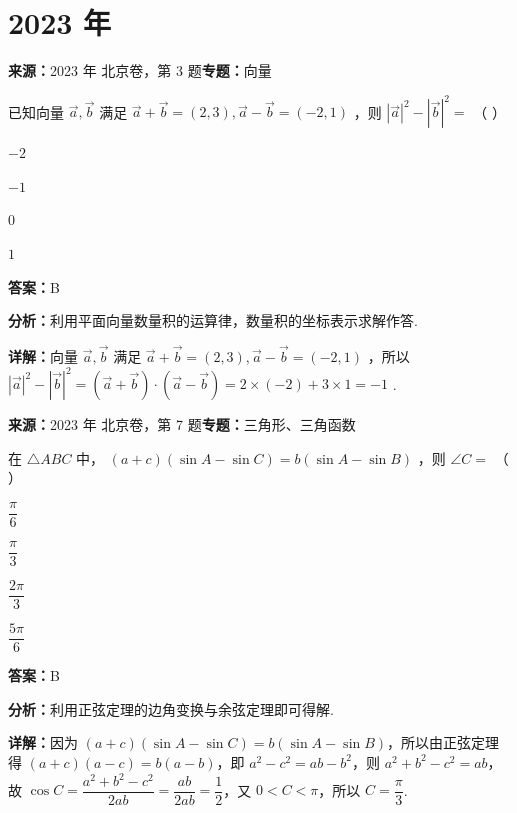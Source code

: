 \section*{2023 年}

\begin{question}[points=4]
\textbf{来源：}2023 年 北京卷，第 3 题\quad \textbf{专题：}向量\par
已知向量 $\vec{a}, \vec{b}$ 满足 $\vec{a} + \vec{b} = (2,3), \vec{a} - \vec{b} = (-2,1)$ ，则 $|\vec{a}|^2 - |\vec{b}|^2 =$ （ ）
\begin{choices}
  \item $-2$
  \item $-1$
  \item $0$
  \item $1$
\end{choices}
\begin{solution}
\textbf{答案：}B

\textbf{分析：}利用平面向量数量积的运算律，数量积的坐标表示求解作答.

\textbf{详解：}向量 $\vec{a}, \vec{b}$ 满足 $\vec{a} + \vec{b} = (2,3), \vec{a} - \vec{b} = (-2,1)$ ，所以 $|\vec{a}|^2 - |\vec{b}|^2 = (\vec{a}+\vec{b})\cdot(\vec{a}-\vec{b}) = 2\times(-2) + 3\times1 = -1$ .
\end{solution}
\end{question}

\begin{question}[points=4]
\textbf{来源：}2023 年 北京卷，第 7 题\quad \textbf{专题：}三角形、三角函数\par
在 $\triangle ABC$ 中， $(a+c)(\sin A - \sin C) = b(\sin A - \sin B)$ ，则 $\angle C =$ （ ）
\begin{choices}
  \item $\dfrac{\pi}{6}$
  \item $\dfrac{\pi}{3}$
  \item $\dfrac{2\pi}{3}$
  \item $\dfrac{5\pi}{6}$
\end{choices}
\begin{solution}
\textbf{答案：}B

\textbf{分析：}利用正弦定理的边角变换与余弦定理即可得解.

\textbf{详解：}因为 $(a+c)(\sin A - \sin C) = b(\sin A - \sin B)$，所以由正弦定理得 $(a+c)(a-c) = b(a-b)$，即 $a^2 - c^2 = ab - b^2$，则 $a^2 + b^2 - c^2 = ab$，故 $\cos C = \dfrac{a^2+b^2-c^2}{2ab} = \dfrac{ab}{2ab} = \dfrac{1}{2}$，又 $0 < C < \pi$，所以 $C = \dfrac{\pi}{3}$.
\end{solution}
\end{question}

